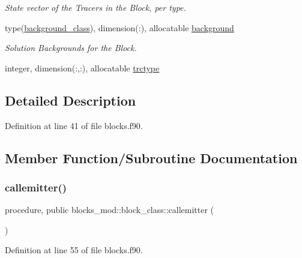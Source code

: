 \begin{DoxyCompactItemize}
\begin{DoxyCompactList}\small\item\em State vector of the Tracers in the Block, per type. \end{DoxyCompactList}\item 
type(\mbox{\hyperlink{structbackground__mod_1_1background__class}{background\+\_\+class}}), dimension(\+:), allocatable \mbox{\hyperlink{structblocks__mod_1_1block__class_a774c07bf82d1392236abc81c285ea943}{background}}
\begin{DoxyCompactList}\small\item\em Solution Backgrounds for the Block. \end{DoxyCompactList}\item 
integer, dimension(\+:,\+:), allocatable \mbox{\hyperlink{structblocks__mod_1_1block__class_a3ad957b5a86ff6c774dc76521bf5126e}{trctype}}
\end{DoxyCompactItemize}


\subsection{Detailed Description}


Definition at line 41 of file blocks.\+f90.



\subsection{Member Function/\+Subroutine Documentation}
\mbox{\label{structblocks__mod_1_1block__class_ad1d0f1aca1323fad86177deb0b818a51}} 
\subsubsection{\texorpdfstring{callemitter()}{callemitter()}}
{\footnotesize\ttfamily procedure, public blocks\+\_\+mod\+::block\+\_\+class\+::callemitter (\begin{DoxyParamCaption}{ }\end{DoxyParamCaption})}



Definition at line 55 of file blocks.\+f90.

\mbox{\label{structblocks__mod_1_1block__class_a17439a0d58c047428bee213d2a7b4bd5}} 
